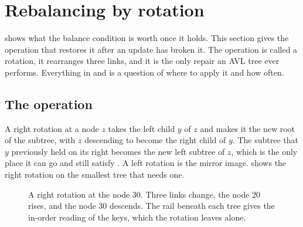 \section{Rebalancing by rotation}
\label{sec:rotations}

 shows what the balance condition is worth once it holds. This
section gives the operation that restores it after an update has broken it. The
operation is called a rotation, it rearranges three links, and it is the only
repair an AVL tree ever performs. Everything in  and
 is a question of where to apply it and how often.

\subsection{The operation}

A right rotation at a node $z$ takes the left child $y$ of $z$ and makes it the
new root of the subtree, with $z$ descending to become the right child of $y$.
The subtree that $y$ previously held on its right becomes the new left subtree of
$z$, which is the only place it can go and still satisfy . A left
rotation is the mirror image.  shows the right rotation on the
smallest tree that needs one.

\begin{figure}[t]
  \centering
  
  \caption{A right rotation at the node $30$. Three links change, the node $20$
  rises, and the node $30$ descends. The rail beneath each tree gives the
  in-order reading of the keys, which the rotation leaves alone.}
  \label{fig:rotation}
\end{figure}

\begin{algorithm}[t]
\caption{Rotations. Each one rewrites three links and recomputes two heights.}
\label{alg:rotate}
\BlankLine
{}
\end{algorithm}

